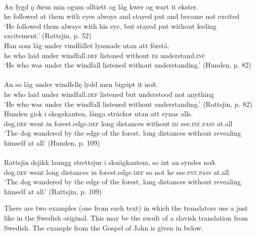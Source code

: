 \documentclass[output=paper]{langscibook}
\begin{document}
\ex {}\label{ex:kalm:23b}\\ 
\gll An fygd ǫ ðiem min ogum olltiett og låg kwer og wart it ekster.\\
he followed at them with eyes always and stayed put and became not excited\\
\glt ‘He followed them always with his eye, but stayed put without feeling excitement.’ (Rattsjin, p. 52)
\z 
\ex
\label{ex:kalm:24}
\ea {}\label{ex:kalm:24a}\\
\gll Han som låg under vindfället lyssnade utan att förstå.\\
he who laid under windfall.\textsc{def} listened without \textsc{im} understand.\textsc{inf}\\
\glt ‘He who was under the windfall listened without understanding.’ (Hunden, p. 82)\\
\ex {}\label{ex:kalm:24b}\\ 
\gll An so låg under windfellę lydd men bigript it noð.\\
he who laid under windfall.\textsc{def} listened but understood not anything\\
\glt ‘He who was under the windfall listened without understanding.’ (Rattsjin, p. 82)
\z
\ex
\label{ex:kalm:25}
\ea {}\label{ex:kalm:25a}\\
\gll Hunden gick i skogskanten, långa sträckor utan att synas alls.\\
dog.\textsc{def} went in forest.edge.\textsc{def} long distances without \textsc{im} see.\textsc{inf.pass} at.all\\
\glt ‘The dog wandered by the edge of the forest, long distances without revealing himself at all’ (Hunden, p. 109)\\
\ex {}\label{ex:kalm:25b}\\ 
\gll Rattsjin dsjikk laungg strettsjur i skuägkantem, so int an syndes noð.\\
dog.\textsc{def} went long distances in forest.edge.\textsc{def} so not he see.\textsc{pst.pass} at.all\\
\glt ‘The dog wandered by the edge of the forest, long distances without revealing himself at all.’ (Rattsjin, p. 109)
\z 
\z 


There are two examples (one from each text) in which the translators use a  just like in the Swedish original. This may be the result of a slavish translation from Swedish. The example from the Gospel of John is given in  below.\pagebreak
\end{document}
